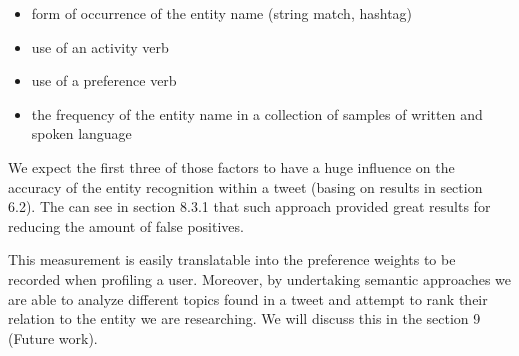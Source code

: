 \begin{itemize}
  \item form of occurrence of the entity name (string match, hashtag)
  \item use of an activity verb
  \item use of a preference verb
  \item the frequency of the entity name in a collection of samples of written and spoken language
\end{itemize}

We expect the first three of those factors to have a huge influence on the accuracy of the entity recognition within a tweet (basing on results in section 6.2). The can see in section 8.3.1 that such approach provided great results for
reducing the amount of false positives.

This measurement is easily translatable into the preference weights to be recorded when profiling a user.
Moreover, by undertaking semantic approaches we are able to analyze different topics found in a tweet and
attempt to rank their relation to the entity we are researching. We will discuss this in the section 9 (Future work).

